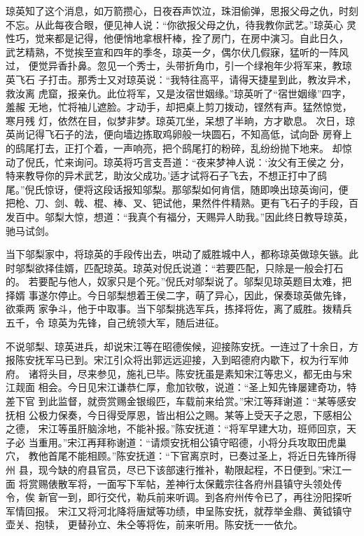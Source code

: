 琼英知了这个消息，如万箭攒心，日夜吞声饮泣，珠泪偷弹，思报父母之仇，时刻
不忘。从此每夜合眼，便见神人说：“你欲报父母之仇，待我教你武艺。”琼英心
灵性巧，觉来都是记得，他便悄地拿根杆棒，拴了房门，在房中演习。自此日久，
武艺精熟，不觉挨至宣和四年的季冬，琼英一夕，偶尔伏几假寐，猛听的一阵风过，
便觉异香扑鼻。忽见一个秀士，头带折角巾，引一个绿袍年少将军来，教琼英飞石
子打击。那秀士又对琼英说：“我特往高平，请得天捷星到此，教汝异术，救汝离
虎窟，报亲仇。此位将军，又是汝宿世姻缘。”琼英听了“宿世姻缘”四字，羞赧
无地，忙将袖儿遮脸。才动手，却把桌上剪刀拨动，铿然有声。猛然惊觉，寒月残
灯，依然在目，似梦非梦。琼英兀坐，呆想了半晌，方才歇息。
次日，琼英尚记得飞石子的法，便向墙边拣取鸡卵般一块圆石，不知高低，试向卧
房脊上的鸱尾打去，正打个着，一声响亮，把个鸱尾打的粉碎，乱纷纷抛下地来。
却惊动了倪氏，忙来询问。琼英将巧言支吾道：“夜来梦神人说：‘汝父有王侯之
分，特来教导你的异术武艺，助汝父成功。’适才试将石子飞去，不想正打中了鸱
尾。”倪氏惊讶，便将这段话报知邬梨。那邬梨如何肯信，随即唤出琼英询问，便
把枪、刀、剑、戟、棍、棒、叉、钯试他，果然件件精熟。更有飞石子的手段，百
发百中。邬梨大惊，想道：“我真个有福分，天赐异人助我。”因此终日教导琼英，
驰马试剑。

当下邬梨家中，将琼英的手段传出去，哄动了威胜城中人，都称琼英做琼矢镞。此
时邬梨欲择佳婿，匹配琼英。琼英对倪氏说道：“若要匹配，只除是一般会打石的。
若要配与他人，奴家只是个死。”倪氏对邬梨说了。邬梨见琼英题目太难，把择婿
事遂尔停止。今日邬梨想着王侯二字，萌了异心，因此，保奏琼英做先锋，欲乘两
家争斗，他于中取事。当下邬梨挑选军兵，拣择将佐，离了威胜。拨精兵五千，令
琼英为先锋，自己统领大军，随后进征。

不说邬梨、琼英进兵，却说宋江等在昭德俟候，迎接陈安抚。一连过了十余日，方
报陈安抚军马已到。宋江引众将出郭远远迎接，入到昭德府内歇下，权为行军帅府。
诸将头目，尽来参见，施礼已毕。陈安抚虽是素知宋江等忠义，都无由与宋江觌面
相会。今日见宋江谦恭仁厚，愈加钦敬，说道：“圣上知先锋屡建奇功，特差下官
到此监督，就赍赏赐金银缎匹，车载前来给赏。”宋江等拜谢道：“某等感安抚相
公极力保奏，今日得受厚恩，皆出相公之赐。某等上受天子之恩，下感相公之德，
宋江等虽肝脑涂地，不能补报。”陈安抚道：“将军早建大功，班师回京，天子必
当重用。”宋江再拜称谢道：“请烦安抚相公镇守昭德，小将分兵攻取田虎巢穴，
教他首尾不能相顾。”陈安抚道：“下官离京时，已奏过圣上，将近日先锋所得州
县，现今缺的府县官员，尽已下该部速行推补，勒限起程，不日便到。”宋江一面
将赏赐俵散军将，一面写下军帖，差神行太保戴宗往各府州县镇守头领处传令，俟
新官一到，即行交代，勒兵前来听调。到各府州传令已了，再往汾阳探听军情回报。
宋江又将河北降将唐斌等功绩，申呈陈安抚，就荐举金鼎、黄钺镇守壶关、抱犊，
更替孙立、朱仝等将佐，前来听用。陈安抚一一依允。

